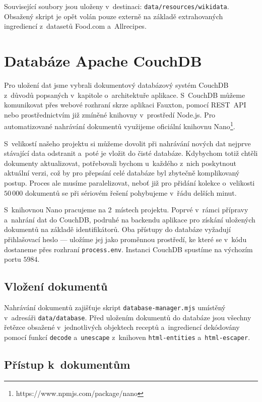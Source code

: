 Související soubory jsou uloženy v~destinaci: \texttt{data/resources/wikidata}. Obsažený skript je opět volán pouze externě na základě extrahovaných ingrediencí z~datasetů Food.com a~Allrecipes. 

\section{Databáze Apache CouchDB}

Pro uložení dat jsme vybrali dokumentový databázový systém CouchDB z~důvodů popsaných v~kapitole o~architektuře aplikace.  S~CouchDB můžeme komunikovat přes webové rozhraní skrze aplikaci Fauxton, pomocí REST~API nebo prostřednictvím již zmíněné knihovny v~prostředí Node.js. Pro automatizované nahrávání dokumentů využijeme oficiální knihovnu Nano\footnote{https://www.npmjs.com/package/nano}.

S~velikostí našeho projektu si můžeme dovolit při nahrávání nových dat nejprve stávající data odstranit a~poté je vložit do čisté databáze. Kdybychom totiž chtěli dokumenty aktualizovat, potřebovali bychom u~každého z~nich poskytnout aktuální verzi, což by pro přepsání celé databáze byl zbytečně komplikovaný postup. Proces ale musíme paralelizovat, neboť již pro přidání kolekce o~velikosti $50\,000$ dokumentů se při sériovém řešení pohybujeme v~řádu delších minut.

S~knihovnou Nano pracujeme na $2$~místech projektu. Poprvé v~rámci přípravy a~nahrání dat do CouchDB, podruhé na backendu aplikace pro získání uložených dokumentů na základě identifikátorů. Oba přístupy do databáze vyžadují přihlašovací heslo --- uložíme jej jako proměnnou prostředí, ke které se v~kódu dostaneme přes rozhraní \texttt{process.env}. Instanci CouchDB spustíme na výchozím portu $5984$.

\subsection{Vložení dokumentů}

Nahrávání dokumentů zajišťuje skript \texttt{database-manager.mjs} umístěný v~adresáři \texttt{data/database}. Před uložením dokumentů do databáze jsou všechny řetězce obsažené v~jednotlivých objektech receptů a~ingrediencí dekódovány pomocí funkcí \texttt{decode} a~\texttt{unescape} z~knihoven \texttt{html-entities} a~\texttt{html-escaper}.

\subsection{Přístup k~dokumentům}

